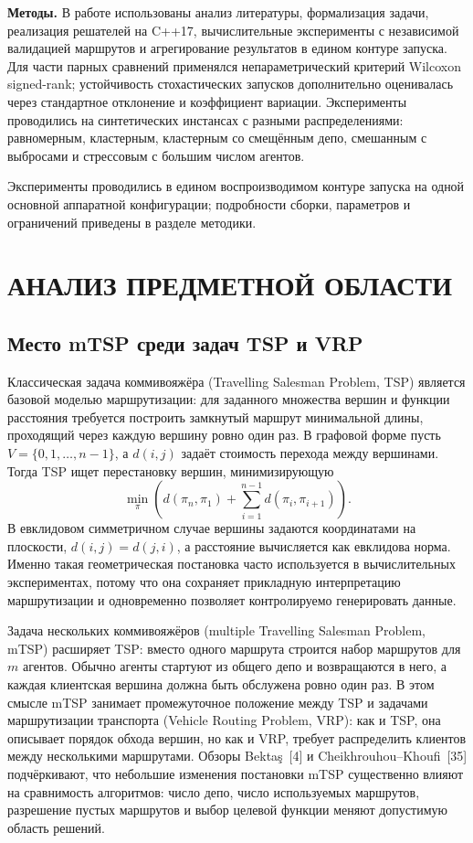 \documentclass[14pt,a4paper]{extarticle}
\newcommand{\source}[1]{[#1]}
\begin{document}
\textbf{Методы.} В работе использованы анализ литературы, формализация задачи, реализация решателей на C++17, вычислительные эксперименты с независимой валидацией маршрутов и агрегирование результатов в едином контуре запуска. Для части парных сравнений применялся непараметрический критерий Wilcoxon signed-rank; устойчивость стохастических запусков дополнительно оценивалась через стандартное отклонение и коэффициент вариации. Эксперименты проводились на синтетических инстансах с разными распределениями: равномерным, кластерным, кластерным со смещённым депо, смешанным с выбросами и стрессовым с большим числом агентов.

Эксперименты проводились в едином воспроизводимом контуре запуска на одной основной аппаратной конфигурации; подробности сборки, параметров и ограничений приведены в разделе методики.


\section{АНАЛИЗ ПРЕДМЕТНОЙ ОБЛАСТИ}

\subsection{Место mTSP среди задач TSP и VRP}

Классическая задача коммивояжёра (Travelling Salesman Problem, TSP) является базовой моделью маршрутизации: для заданного множества вершин и функции расстояния требуется построить замкнутый маршрут минимальной длины, проходящий через каждую вершину ровно один раз. В графовой форме пусть $V=\{0,1,\ldots,n-1\}$, а $d(i,j)$ задаёт стоимость перехода между вершинами. Тогда TSP ищет перестановку вершин, минимизирующую
\begin{equation}
\min_{\pi} \left(d(\pi_n,\pi_1)+\sum_{i=1}^{n-1} d(\pi_i,\pi_{i+1})\right).
\end{equation}
В евклидовом симметричном случае вершины задаются координатами на плоскости, $d(i,j)=d(j,i)$, а расстояние вычисляется как евклидова норма. Именно такая геометрическая постановка часто используется в вычислительных экспериментах, потому что она сохраняет прикладную интерпретацию маршрутизации и одновременно позволяет контролируемо генерировать данные.

Задача нескольких коммивояжёров (multiple Travelling Salesman Problem, mTSP) расширяет TSP: вместо одного маршрута строится набор маршрутов для $m$ агентов. Обычно агенты стартуют из общего депо и возвращаются в него, а каждая клиентская вершина должна быть обслужена ровно один раз. В этом смысле mTSP занимает промежуточное положение между TSP и задачами маршрутизации транспорта (Vehicle Routing Problem, VRP): как и TSP, она описывает порядок обхода вершин, но как и VRP, требует распределить клиентов между несколькими маршрутами. Обзоры Bektaş~\source{4} и Cheikhrouhou--Khoufi~\source{35} подчёркивают, что небольшие изменения постановки mTSP существенно влияют на сравнимость алгоритмов: число депо, число используемых маршрутов, разрешение пустых маршрутов и выбор целевой функции меняют допустимую область решений.
\end{document}
